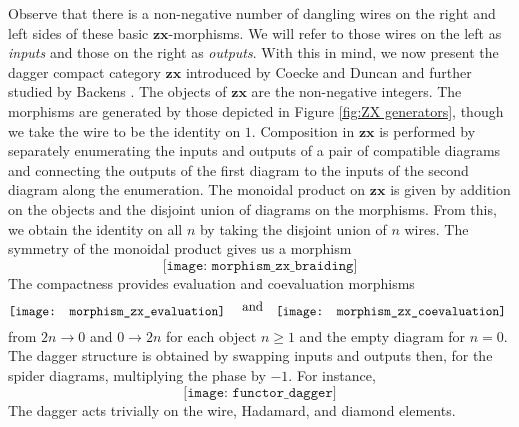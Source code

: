 \documentclass[11pt]{amsart}
\newcommand{\cat}[1]{\mathbf{#1}}
\theoremstyle{remark}
\theoremstyle{definition}
\begin{document}
Observe that there is a non-negative number of dangling wires on the right and left sides of these basic $\cat{zx}$-morphisms. We will refer to those wires on the left as \emph{inputs} and those on the right as \emph{outputs}. With this in mind, we now present the dagger compact category $\cat{zx}$ introduced by Coecke and Duncan \cite{CoeckeDuncan_QuantumObs} and further studied by Backens \cite{Backens_Completeness}. The objects of $\cat{zx}$ are the non-negative integers.  The morphisms are generated by those depicted in Figure \ref{fig:ZX generators}, though we take the wire to be the identity on $1$.  Composition in $\cat{zx}$ is performed by separately enumerating the inputs and outputs of a pair of compatible diagrams  and connecting the outputs of the first diagram to the inputs of the second diagram along the enumeration.  The monoidal product on $\cat{zx}$ is given by addition on the objects and the disjoint union of diagrams on the morphisms. From this, we obtain the identity on all $n$ by taking the disjoint union of $n$ wires. The symmetry of the monoidal product gives us a morphism
\[
\texttt{[image: morphism\_zx\_braiding]}
\]
The compactness provides evaluation and coevaluation morphisms
\[
	\raisebox{-0.5\height}{%
		\texttt{[image: morphism\_zx\_evaluation]}
	}
	\quad \text{and} \quad
	\raisebox{-0.5\height}{%
		\texttt{[image: morphism\_zx\_coevaluation]}
	}
\]
from $2n \to 0$ and $0 \to 2n$ for each object $n \geq 1$ and the empty diagram for $n=0$.  The dagger structure is obtained by swapping inputs and outputs then, for the spider diagrams, multiplying the phase by $-1$.  For instance, 
\[
\texttt{[image: functor\_dagger]}
\]
The dagger acts trivially on the wire, Hadamard, and diamond elements. 
\end{document}

